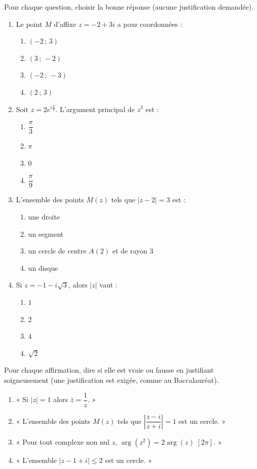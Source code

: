 \documentclass[11pt]{article}
\begin{document}
\begin{exercice}
Pour chaque question, choisir la bonne réponse (aucune justification demandée).
\begin{enumerate}
\item Le point $M$ d'affixe $z = -2 + 3i$ a pour coordonnées :
\begin{enumerate}
\item $(-2\,;\,3)$ \quad \item $(3\,;\,-2)$ \quad \item $(-2\,;\,-3)$ \quad \item $(2\,;\,3)$
\end{enumerate}
\item Soit $z = 2e^{i\frac{\pi}{3}}$. L'argument principal de $z^3$ est :
\begin{enumerate}
\item $\dfrac{\pi}{3}$ \quad \item $\pi$ \quad \item $0$ \quad \item $\dfrac{\pi}{9}$
\end{enumerate}
\item L'ensemble des points $M(z)$ tels que $|z - 2| = 3$ est :
\begin{enumerate}
\item une droite \quad \item un segment \quad \item un cercle de centre $A(2)$ et de rayon $3$ \quad \item un disque
\end{enumerate}
\item Si $z = -1 - i\sqrt{3}$, alors $|z|$ vaut :
\begin{enumerate}
\item $1$ \quad \item $2$ \quad \item $4$ \quad \item $\sqrt{2}$
\end{enumerate}
\end{enumerate}
\end{exercice}

\begin{exercice}
Pour chaque affirmation, dire si elle est vraie ou fausse en justifiant soigneusement (une justification est exigée, comme au Baccalauréat).
\begin{enumerate}
\item « Si $|z| = 1$ alors $\bar{z} = \dfrac{1}{z}$. »
\item « L'ensemble des points $M(z)$ tels que $\left|\dfrac{z - i}{z + i}\right| = 1$ est un cercle. »
\item « Pour tout complexe non nul $z$, $\arg(z^2) = 2\arg(z) \;[2\pi]$. »
\item « L'ensemble $|z - 1 + i| \leq 2$ est un cercle. »
\end{enumerate}
\end{exercice}
\end{document}
